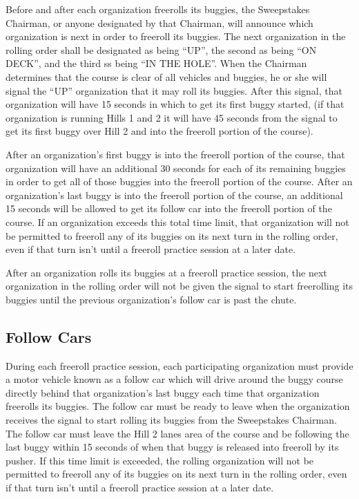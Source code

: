 	Before and after each organization freerolls its buggies, the Sweepstakes
	Chairman, or anyone designated by that Chairman, will announce which
	organization is next in order to freeroll its buggies. The next organization in
	the rolling order shall be designated as being ``UP'', the second as being ``ON
	DECK'', and the third ss being ``IN THE HOLE''. When the Chairman determines
	that the course is clear of all vehicles and buggies, he or she will signal the
	``UP'' organization that it may roll its buggies. After this signal, that
	organization will have 15 seconds in which to get its first buggy started, (if
	that organization is running Hills 1 and 2 it will have 45 seconds from the
	signal to get its first buggy over Hill 2 and into the freeroll portion of the
	course).

	After an organization's first buggy is into the freeroll portion of the course,
	that organization will have an additional 30 seconds for each of its remaining
	buggies in order to get all of those buggies into the freeroll portion of the
	course. After an organization's last buggy is into the freeroll portion of the
	course, an additional 15 seconds will be allowed to get its follow car into the
	freeroll portion of the course. If an organization exceeds this total time
	limit, that organization will not be permitted to freeroll any of its buggies
	on its next turn in the rolling order, even if that turn isn't until a freeroll
	practice session at a later date.

	After an organization rolls its buggies at a freeroll practice session, the
	next organization in the rolling order will not be given the signal to start
	freerolling its buggies until the previous organization's follow car is past
	the chute.

\subsection{Follow Cars}

	During each freeroll practice session, each participating organization must
	provide a motor vehicle known as a follow car which will drive around the buggy
	course directly behind that organization's last buggy each time that
	organization freerolls its buggies. The follow car must be ready to leave when
	the organization receives the signal to start rolling its buggies from the
	Sweepstakes Chairman. The follow car must leave the Hill 2 lanes area of the
	course and be following the last buggy within 15 seconds of when that buggy is
	released into freeroll by its pusher. If this time limit is exceeded, the
	rolling organization will not be permitted to freeroll any of its buggies on
	its next turn in the rolling order, even if that turn isn't until a freeroll
	practice session at a later date.

